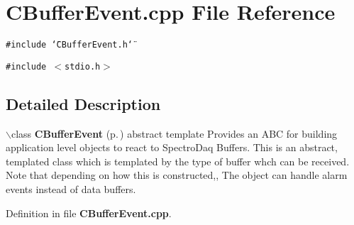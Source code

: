 \section{CBuffer\-Event.cpp File Reference}
\label{CBufferEvent_8cpp}
{\tt \#include \char`\"{}CBuffer\-Event.h\char`\"{}}\par
{\tt \#include $<$stdio.h$>$}\par


\subsection{Detailed Description}


$\backslash$class {\bf CBuffer\-Event} {\rm (p.\,\pageref{classCBufferEvent})} abstract template Provides an ABC for building application level objects to react to Spectro\-Daq Buffers. This is an abstract, templated class which is templated by the type of buffer whch can be received. Note that depending on how this is constructed,, The object can handle alarm events instead of data buffers.



Definition in file {\bf CBuffer\-Event.cpp}.